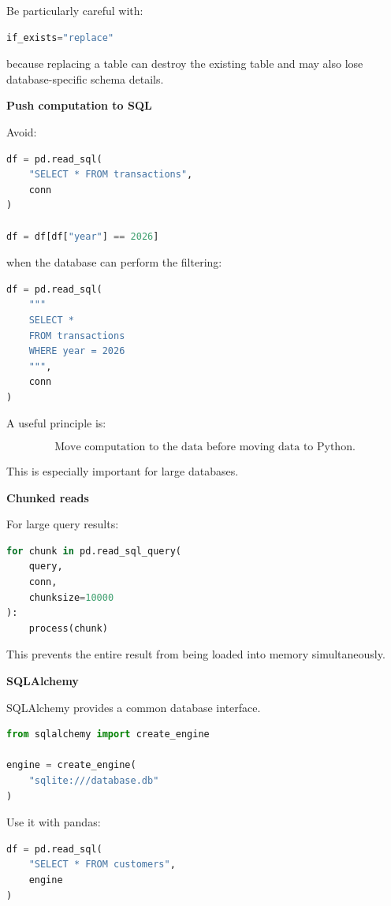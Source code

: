 \documentclass[11pt,letterpaper]{article}
\begin{document}
Be particularly careful with:

\begin{lstlisting}[language=Python]
if_exists="replace"
\end{lstlisting}

because replacing a table can destroy the existing table and may also lose
database-specific schema details.

\textbf{Push computation to SQL}

Avoid:

\begin{lstlisting}[language=Python]
df = pd.read_sql(
    "SELECT * FROM transactions",
    conn
)

df = df[df["year"] == 2026]
\end{lstlisting}

when the database can perform the filtering:

\begin{lstlisting}[language=Python]
df = pd.read_sql(
    """
    SELECT *
    FROM transactions
    WHERE year = 2026
    """,
    conn
)
\end{lstlisting}

A useful principle is:

\[
\boxed{\text{Move computation to the data before moving data to Python.}}
\]

This is especially important for large databases.

\textbf{Chunked reads}

For large query results:

\begin{lstlisting}[language=Python]
for chunk in pd.read_sql_query(
    query,
    conn,
    chunksize=10000
):
    process(chunk)
\end{lstlisting}

This prevents the entire result from being loaded into memory simultaneously.

\textbf{SQLAlchemy}

SQLAlchemy provides a common database interface.

\begin{lstlisting}[language=Python]
from sqlalchemy import create_engine

engine = create_engine(
    "sqlite:///database.db"
)
\end{lstlisting}

Use it with pandas:

\begin{lstlisting}[language=Python]
df = pd.read_sql(
    "SELECT * FROM customers",
    engine
)
\end{lstlisting}
\end{document}
